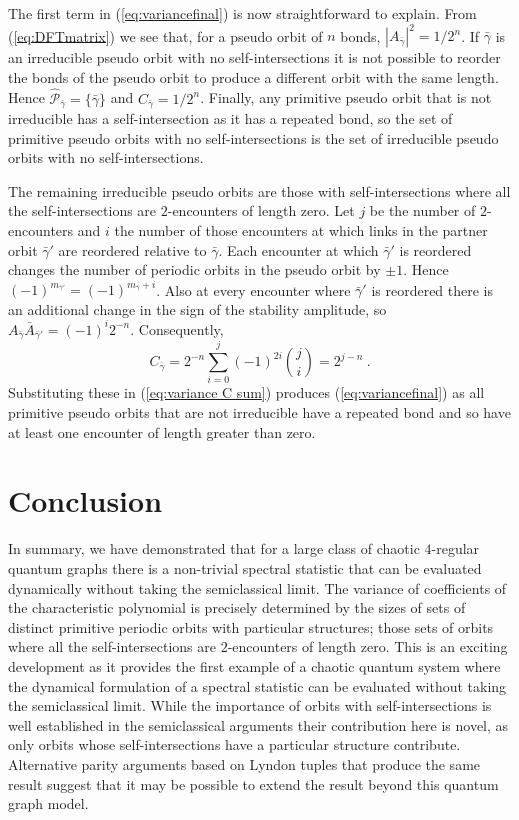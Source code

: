 \documentclass[doublecol]{epl2}
\newcommand{\bg}{\bar{\gamma}}
\begin{document}
The first term in (\ref{eq:variancefinal}) is now straightforward to explain.  From (\ref{eq:DFTmatrix}) we see that, for a pseudo orbit of $n$ bonds, $|A_{\bg}|^2=1/2^n$.  If $\bg$ is an irreducible pseudo orbit with no self-intersections it is not possible to reorder the bonds of the pseudo orbit to produce a different orbit with the same length.  Hence ${ \widehat{\mathcal{P}}_{\bg}}=\{\bg \}$ and $C_{\bg}=1/2^n$.  
Finally, any primitive pseudo orbit that is not irreducible has a self-intersection as it has a repeated bond, so the set of primitive pseudo orbits with no self-intersections is the set of irreducible pseudo orbits with no self-intersections.

The remaining irreducible pseudo orbits are those with self-intersections where all the self-intersections are $2$-encounters of length zero. Let $j$ be the number of $2$-encounters and $i$ the number of those encounters at which links in the partner orbit $\bg'$ are reordered relative to $\bg$.  Each encounter at which $\bg'$ is reordered 
changes the number of periodic orbits in the pseudo orbit by $\pm 1$.  Hence $(-1)^{m_{\bg'}}=(-1)^{m_{\bg}+i}$.  Also at every encounter where $\bg'$ is reordered there is an additional change in the sign of the stability amplitude, so $A_{\bg} \bar{A}_{\bg'} =(-1)^i 2^{-n}$.  Consequently,
\begin{equation}
C_{\bg} =  
2^{-n}
\sum_{i=0}^j (-1)^{2i}
\binom{j}{i}   
= 2^{j-n}  \ .
\end{equation}
Substituting these in (\ref{eq:variance C sum}) produces (\ref{eq:variancefinal}) as all primitive pseudo orbits that are not irreducible have a repeated bond and so have at least one encounter of length greater than zero.

\section{Conclusion} In summary, we have demonstrated that for a large class of chaotic $4$-regular quantum graphs there is a non-trivial spectral statistic that can be evaluated dynamically without taking the semiclassical limit.   The variance of coefficients of the characteristic polynomial is precisely determined by the sizes of sets of distinct primitive periodic orbits with  particular structures; those sets of orbits where all the self-intersections are $2$-encounters of length zero.  This is an exciting development as it provides the first example of a chaotic quantum system where the dynamical formulation of a spectral statistic can be evaluated without taking the semiclassical limit.   While the importance of orbits with self-intersections is well established in the semiclassical arguments their contribution here is novel, as only orbits whose self-intersections have a particular structure contribute. Alternative parity arguments based on Lyndon tuples \cite{HH20} that produce the same result suggest that it may be possible to  extend the result beyond this quantum graph model.  
\end{document}
